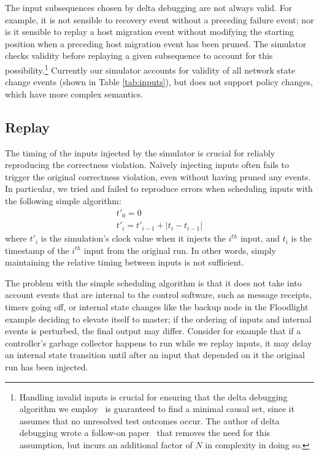 The input subsequences chosen by delta debugging are not always valid. For
example, it is not sensible to recovery event without a
preceding failure event; nor is it sensible to replay a host migration
event without modifying the starting position when a preceding host
migration event has been pruned. The simulator checks
validity before replaying a given subsequence to account for this
possibility.\footnote{Handling invalid inputs is crucial for
ensuring that the delta debugging algorithm we employ~\cite{Zeller:1999:YMP:318773.318946}
is guaranteed to find a minimal causal set, since it assumes that no unresolved
test outcomes occur. The author of delta debugging wrote a follow-on
paper~\cite{Zeller:2002:SIF:506201.506206} that removes the need for this assumption,
but incurs an additional factor of $N$ in complexity in doing so.}
Currently our simulator accounts for validity of all network state change
events (shown in Table \ref{tab:inputs}), but does not support policy changes,
which have more complex semantics.

\subsection{Replay}
\label{subsec:replay}

The timing of the inputs injected by the simulator is crucial for reliably
reproducing the
correctness violation. Na\"ively injecting inputs often fails to
trigger the original correctness violation, even without having pruned any
events. In particular, we tried and failed to reproduce errors when scheduling inputs
with the following simple algorithm:
\begin{align*}
t'_0 = 0 \\
t'_i = t'_{i-1} + |t_{i} - t_{i-1}|
\end{align*}
where $t'_i$ is the simulation's clock value when it injects the $i^{th}$ input, and $t_i$ is
the timestamp of the $i^{th}$ input from the original run. In other words, simply
maintaining the relative timing between inputs is not sufficient.

The problem with the simple scheduling algorithm is that it does not take into
account events that are internal to the control software, such as
message receipts, timers going off, or internal state
changes like the backup node in the Floodlight example deciding to elevate
itself to master; if the ordering of inputs and internal events is
perturbed, the final output may differ.
Consider for example that if a controller's garbage collector happens to run
while we replay inputs, it may delay an internal state transition until
after an input that depended on it the original run has been injected.

